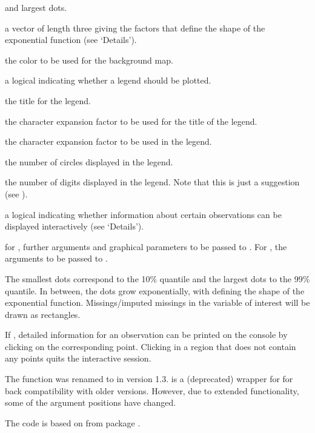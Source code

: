\begin{Arguments}
\begin{ldescription}
and largest dots.
\item[\code{exp}] a vector of length three giving the factors that define the 
shape of the exponential function (see `Details').
\item[\code{col.map}] the color to be used for the background map.
\item[\code{legend}] a logical indicating whether a legend should be plotted.
\item[\code{legtitle}] the title for the legend.
\item[\code{cex.legtitle}] the character expansion factor to be used for the 
title of the legend.
\item[\code{cex.legtext}] the character expansion factor to be used in the 
legend.
\item[\code{ncircles}] the number of circles displayed in the legend.
\item[\code{ndigits}] the number of digits displayed in the legend.  Note that \bsl{}
this is just a suggestion (see ).
\item[\code{interactive}] a logical indicating whether information about 
certain observations can be displayed interactively (see 
`Details').
\item[\code{...}] for , further arguments and graphical 
parameters to be passed to .  For , 
the arguments to be passed to .
\end{ldescription}
\end{Arguments}
%
\begin{Details}\relax
The smallest dots correspond to the 10\% quantile and the largest 
dots to the 99\% quantile.  In between, the dots grow exponentially, 
with  defining the shape of the exponential function.
Missings/imputed missings in the variable of interest will be drawn as
rectangles.

If , detailed information for an observation 
can be printed on the console by clicking on the corresponding point.  
Clicking in a region that does not contain any points quits the 
interactive session.
\end{Details}
%
\begin{Note}\relax
The function was renamed to  in version 1.3. 
 is a (deprecated) wrapper for  
for back compatibility with older versions. However, due to extended 
functionality, some of the argument positions have changed. 

The code is based on  from package 
.
\end{Note}

